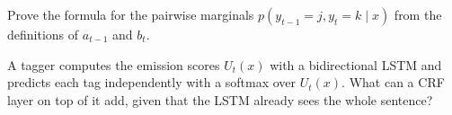 \begin{notechapter}
\begin{exercise}\label{crf:exr:4}
Prove the formula for the pairwise marginals $p(y_{t-1} = j, y_t = k\mid x)$ from the definitions of $a_{t-1}$ and $b_t$.
\end{exercise}

\begin{exercise}\label{crf:exr:5}
A tagger computes the emission scores $U_t(x)$ with a bidirectional LSTM and predicts each tag
independently with a softmax over $U_t(x)$. What can a CRF layer on top of it add, given that the
LSTM already sees the whole sentence?
\end{exercise}
\end{notechapter}

